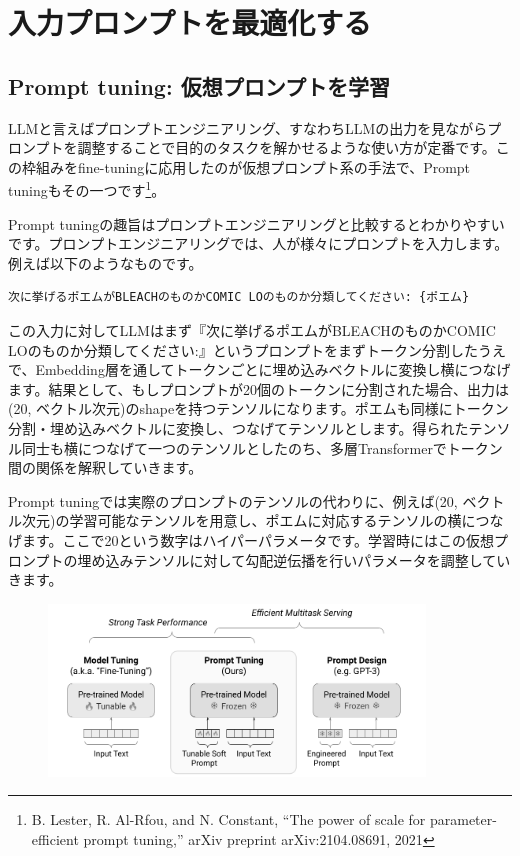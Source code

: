 \documentclass[a5paper,twoside,dvipdfmx]{jsarticle}
\begin{document}
\newpage

\section{入力プロンプトを最適化する}

\subsection{Prompt tuning: 仮想プロンプトを学習}

LLMと言えばプロンプトエンジニアリング、すなわちLLMの出力を見ながらプロンプトを調整することで目的のタスクを解かせるような使い方が定番です。この枠組みをfine-tuningに応用したのが仮想プロンプト系の手法で、\textsf{Prompt tuning}もその一つです\footnote{B. Lester, R. Al-Rfou, and N. Constant, “The power of scale for parameter-efficient prompt tuning,” arXiv preprint arXiv:2104.08691, 2021}。

Prompt tuningの趣旨はプロンプトエンジニアリングと比較するとわかりやすいです。プロンプトエンジニアリングでは、人が様々にプロンプトを入力します。例えば以下のようなものです。

\begin{lstlisting}
次に挙げるポエムがBLEACHのものかCOMIC LOのものか分類してください: {ポエム}
\end{lstlisting}

この入力に対してLLMはまず『次に挙げるポエムがBLEACHのものかCOMIC LOのものか分類してください:』というプロンプトをまずトークン分割したうえで、Embedding層を通してトークンごとに埋め込みベクトルに変換し横につなげます。結果として、もしプロンプトが20個のトークンに分割された場合、出力は(20, ベクトル次元)のshapeを持つテンソルになります。ポエムも同様にトークン分割・埋め込みベクトルに変換し、つなげてテンソルとします。得られたテンソル同士も横につなげて一つのテンソルとしたのち、多層Transformerでトークン間の関係を解釈していきます。

Prompt tuningでは実際のプロンプトのテンソルの代わりに、例えば(20, ベクトル次元)の学習可能なテンソルを用意し、ポエムに対応するテンソルの横につなげます。ここで20という数字はハイパーパラメータです。学習時にはこの仮想プロンプトの埋め込みテンソルに対して勾配逆伝播を行いパラメータを調整していきます。%


\begin{figure}[h]
  \centering
  \includegraphics[width=100mm]{../C105Fig/gray/prompttuning_image.png}
 \end{figure} 
\end{document}
